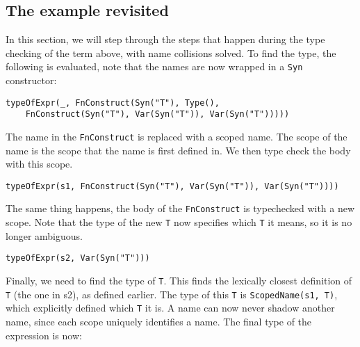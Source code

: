 \subsection{The example revisited}

In this section, we will step through the steps that happen during the type checking of the term above, with name collisions solved. To find the type, the following is evaluated, note that the names are now wrapped in a \verb|Syn| constructor:

\begin{lstlisting}
typeOfExpr(_, FnConstruct(Syn("T"), Type(),
	FnConstruct(Syn("T"), Var(Syn("T")), Var(Syn("T")))))
\end{lstlisting}

\noindent
The name in the \verb|FnConstruct| is replaced with a scoped name. The scope of the name is the scope that the name is first defined in. We then type check the body with this scope.

\begin{lstlisting}
typeOfExpr(s1, FnConstruct(Syn("T"), Var(Syn("T")), Var(Syn("T"))))
\end{lstlisting}


\noindent
The same thing happens, the body of the \verb|FnConstruct| is typechecked with a new scope. Note that the type of the new \verb|T| now specifies which \verb|T| it means, so it is no longer ambiguous.

\begin{lstlisting}
typeOfExpr(s2, Var(Syn("T")))
\end{lstlisting}

Finally, we need to find the type of \verb|T|. This finds the lexically closest definition of \verb|T| (the one in s2), as defined earlier. The type of this \verb|T| is \verb|ScopedName(s1, T)|, which explicitly defined which \verb|T| it is. A name can now never shadow another name, since each scope uniquely identifies a name. The final type of the expression is now:

